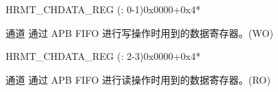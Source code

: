 \begin{register}{H}{RMT\_CHDATA\_REG (: 0-1)}{0x0000+0x4*}\label{regdesc:RMTCHNDATAREG}
%
\regnewline%
\begin{regdesc}\begin{reglist}
\label{fielddesc:RMTCHNDATA}\item [RMT\_CH\regindex{n}DATA] 通道  通过 APB FIFO 进行写操作时用到的数据寄存器。(WO)
\end{reglist}\end{regdesc}
\end{register}


\begin{register}{H}{RMT\_CHDATA\_REG (: 2-3)}{0x0000+0x4*}\label{regdesc:RMTCHMDATAREG}
%
\regnewline%
\begin{regdesc}\begin{reglist}
\label{fielddesc:RMTCHMDATA}\item [RMT\_CH\regindex{m}DATA] 通道  通过 APB FIFO 进行读操作时用到的数据寄存器。(RO)
\end{reglist}\end{regdesc}
\end{register}



